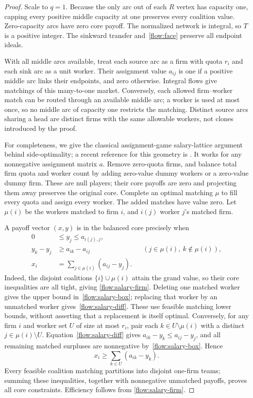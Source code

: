 \documentclass[11pt]{article}
\theoremstyle{remark}
\begin{document}
\begin{proof}
Scale to $q=1$. Because the only arc out of each $R$ vertex has capacity
one, capping every positive middle capacity at one preserves every
coalition value. Zero-capacity arcs have zero core payoff. The normalized
network is integral, so $T$ is a positive integer. The sinkward transfer
and~\eqref{flow:face} preserve all endpoint ideals.

With all middle arcs available, treat each source arc as a firm with
quota $r_i$ and each sink arc as a unit worker. Their assignment value
$a_{ij}$ is one if a positive middle arc links their endpoints, and zero
otherwise. Integral flows give matchings of this many-to-one market.
Conversely, each allowed firm--worker match can be routed through an
available middle arc; a worker is used at most once, so no middle arc
of capacity one restricts the matching. Distinct source arcs sharing a
head are distinct firms with the same allowable workers, not clones
introduced by the proof.

For completeness, we give the classical assignment-game salary-lattice
argument behind side-optimality; a recent reference for this geometry is
\cite{flow:AtayNunezSolymosi2026}. It works for any
nonnegative assignment matrix $a$. Remove zero-quota firms, and balance
total firm quota and worker count by adding zero-value dummy workers
or a zero-value dummy firm. These are null players; their core payoffs
are zero and projecting them away preserves the original core. Complete
an optimal matching $\mu$ to fill every quota and assign every worker.
The added matches have value zero. Let $\mu(i)$ be the workers matched
to firm $i$, and $i(j)$ worker $j$'s matched firm.

A payoff vector $(x,y)$ is in the balanced core precisely when
\begin{align}
 0&\le y_j\le a_{i(j),j},\label{flow:salary-box}\\
 y_k-y_j&\ge a_{ik}-a_{ij}
         &&(j\in\mu(i),\ k\notin\mu(i)),\label{flow:salary-diff}\\
 x_i&=\sum_{j\in\mu(i)}(a_{ij}-y_j).\label{flow:salary-firm}
\end{align}
Indeed, the disjoint coalitions $\{i\}\cup\mu(i)$ attain the grand
value, so their core inequalities are all tight, giving
\eqref{flow:salary-firm}. Deleting one matched worker gives the upper
bound in~\eqref{flow:salary-box}; replacing that worker by an unmatched
worker gives~\eqref{flow:salary-diff}. These use feasible matching
lower bounds, without asserting that a replacement is itself optimal.
Conversely, for any firm $i$ and worker set $U$ of size at most $r_i$,
pair each $k\in U\setminus\mu(i)$ with a distinct
$j\in\mu(i)\setminus U$. Equation~\eqref{flow:salary-diff} gives
$a_{ik}-y_k\le a_{ij}-y_j$, and all remaining matched surpluses are
nonnegative by~\eqref{flow:salary-box}. Hence
\[
                   x_i\ge\sum_{k\in U}(a_{ik}-y_k).
\]
Every feasible coalition matching partitions into disjoint one-firm
teams; summing these inequalities, together with nonnegative unmatched
payoffs, proves all core constraints. Efficiency follows from
\eqref{flow:salary-firm}.


\end{proof}
\end{document}
